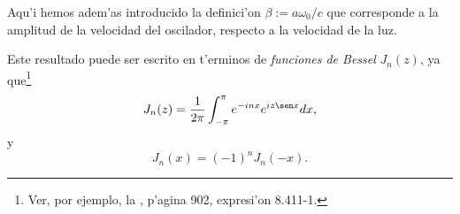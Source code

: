 Aqu'i hemos adem'as introducido la definici'on $\beta:={a\omega_0}/{c}$ que
corresponde a la amplitud de la velocidad del oscilador, respecto a la velocidad
de la luz.

Este resultado puede ser escrito en t'erminos de \textit{funciones de Bessel}
$J_n(z)$, ya que\footnote{Ver, por ejemplo, la \cite{GR00}, p'agina
902, expresi'on 8.411-1.}
\begin{equation}
J_{n}(z)  =\frac{1}{2\pi}\int_{-\pi}^{\pi}e^{-inx}e^{iz\sen x}dx ,
\end{equation}
y
\begin{equation}
 J_n(x)=(-1)^nJ_n(-x).
\end{equation}

